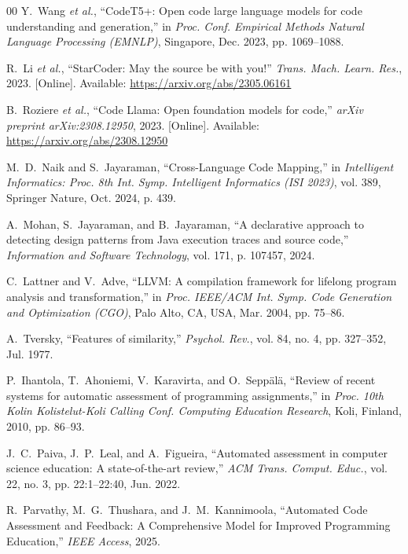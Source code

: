 \begin{thebibliography}{00}
Y.~Wang \emph{et al.}, ``CodeT5+: Open code large language models for code understanding and generation,'' in \emph{Proc. Conf. Empirical Methods Natural Language Processing (EMNLP)}, Singapore, Dec. 2023, pp. 1069--1088.

R.~Li \emph{et al.}, ``StarCoder: May the source be with you!'' \emph{Trans. Mach. Learn. Res.}, 2023. [Online]. Available: \url{https://arxiv.org/abs/2305.06161}

B.~Roziere \emph{et al.}, ``Code Llama: Open foundation models for code,'' \emph{arXiv preprint arXiv:2308.12950}, 2023. [Online]. Available: \url{https://arxiv.org/abs/2308.12950}

M.~D.~Naik and S.~Jayaraman, ``Cross-Language Code Mapping,'' in \emph{Intelligent Informatics: Proc. 8th Int. Symp. Intelligent Informatics (ISI 2023)}, vol. 389, Springer Nature, Oct. 2024, p. 439.

A.~Mohan, S.~Jayaraman, and B.~Jayaraman, ``A declarative approach to detecting design patterns from Java execution traces and source code,'' \emph{Information and Software Technology}, vol. 171, p. 107457, 2024.

C.~Lattner and V.~Adve, ``LLVM: A compilation framework for lifelong program analysis and transformation,'' in \emph{Proc. IEEE/ACM Int. Symp. Code Generation and Optimization (CGO)}, Palo Alto, CA, USA, Mar. 2004, pp. 75--86.

A.~Tversky, ``Features of similarity,'' \emph{Psychol. Rev.}, vol. 84, no. 4, pp. 327--352, Jul. 1977.

P.~Ihantola, T.~Ahoniemi, V.~Karavirta, and O.~Sepp\"{a}l\"{a}, ``Review of recent systems for automatic assessment of programming assignments,'' in \emph{Proc. 10th Kolin Kolistelut-Koli Calling Conf. Computing Education Research}, Koli, Finland, 2010, pp. 86--93.

J.~C.~Paiva, J.~P.~Leal, and A.~Figueira, ``Automated assessment in computer science education: A state-of-the-art review,'' \emph{ACM Trans. Comput. Educ.}, vol. 22, no. 3, pp. 22:1--22:40, Jun. 2022.

R.~Parvathy, M.~G.~Thushara, and J.~M.~Kannimoola, ``Automated Code Assessment and Feedback: A Comprehensive Model for Improved Programming Education,'' \emph{IEEE Access}, 2025.


\end{thebibliography}
